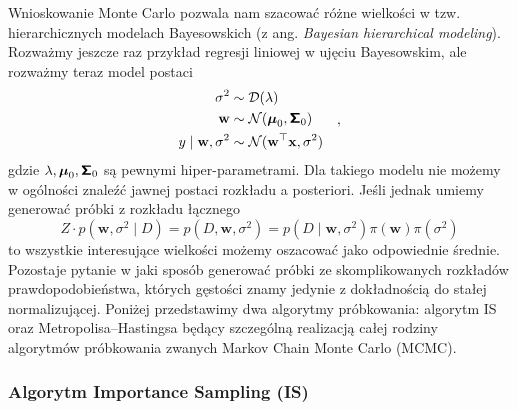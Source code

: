 \documentclass{myclass}
\begin{document}
Wnioskowanie Monte Carlo pozwala nam szacować różne wielkości w tzw. hierarchicznych modelach
Bayesowskich (z ang. \textit{Bayesian hierarchical modeling}). Rozważmy jeszcze raz przykład
regresji liniowej w ujęciu Bayesowskim, ale rozważmy teraz model postaci
\begin{equation*}
    \begin{split}
        \sigma^2 &\sim \mathcal{D}(\lambda)\\
        \mathbf{w} &\sim \mathcal{N}(\boldsymbol{\mu}_0, \boldsymbol{\mathsf{\Sigma}}_0)\\
        y \mid \mathbf{w}, \sigma^2 &\sim \mathcal{N}(\mathbf{w}^\top\mathbf{x}, \sigma^2)
    \end{split}\quad,
\end{equation*}
gdzie \(\lambda, \boldsymbol{\mu}_0, \boldsymbol{\mathsf{\Sigma}}_0\) są pewnymi hiper-parametrami. Dla takiego
modelu nie możemy w ogólności znaleźć jawnej postaci rozkładu a posteriori. Jeśli jednak umiemy
generować próbki z rozkładu łącznego
\begin{equation*}
    Z\cdot p(\mathbf{w}, \sigma^2 \mid D) = p(D, \mathbf{w}, \sigma^2) = p(D \mid \mathbf{w},\sigma^2)\pi(\mathbf{w})\pi(\sigma^2)
\end{equation*}
to wszystkie interesujące wielkości możemy oszacować jako odpowiednie średnie. Pozostaje pytanie w
jaki sposób generować próbki ze skomplikowanych rozkładów prawdopodobieństwa, których gęstości znamy
jedynie z dokładnością do stałej normalizującej. Poniżej przedstawimy dwa algorytmy próbkowania:
algorytm IS oraz Metropolisa--Hastingsa będący szczególną realizacją całej rodziny algorytmów
próbkowania zwanych Markov Chain Monte Carlo (MCMC).

\subsubsection{Algorytm Importance Sampling (IS)}
\end{document}
